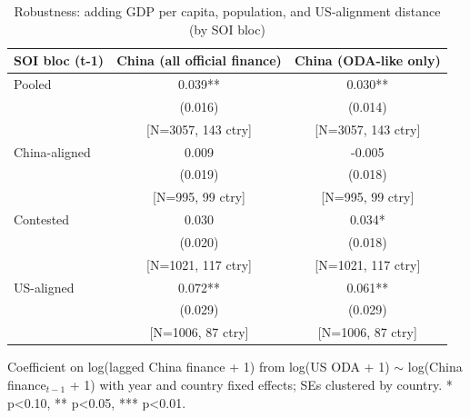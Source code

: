 \begin{table}[htbp]
\centering
\caption{Robustness: adding GDP per capita, population, and US-alignment distance (by SOI bloc)}
\label{tab:soi-controls}
\begin{tabular}{lcc}
\toprule
SOI bloc (t-1) & China (all official finance) & China (ODA-like only) \\
\midrule
Pooled & 0.039** & 0.030** \\
 & (0.016) & (0.014) \\
 & [N=3057, 143 ctry] & [N=3057, 143 ctry] \\[2pt]
China-aligned & 0.009 & -0.005 \\
 & (0.019) & (0.018) \\
 & [N=995, 99 ctry] & [N=995, 99 ctry] \\[2pt]
Contested & 0.030 & 0.034* \\
 & (0.020) & (0.018) \\
 & [N=1021, 117 ctry] & [N=1021, 117 ctry] \\[2pt]
US-aligned & 0.072** & 0.061** \\
 & (0.029) & (0.029) \\
 & [N=1006, 87 ctry] & [N=1006, 87 ctry] \\[2pt]
\bottomrule
\end{tabular}
\begin{minipage}{0.9\textwidth}
\vspace{4pt}
\footnotesize Coefficient on log(lagged China finance + 1) from
log(US ODA + 1) $\sim$ log(China finance$_{t-1}$ + 1) with year and
country fixed effects; SEs clustered by country. * p<0.10, ** p<0.05, *** p<0.01.
\end{minipage}
\end{table}
